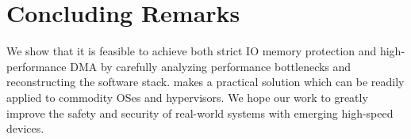 \section{Concluding Remarks}

We show that it is feasible to achieve both strict IO memory protection
    and high-performance DMA by 
    carefully analyzing performance bottlenecks
    and reconstructing the software stack.
{\name} makes a practical solution which can be readily applied to 
    commodity OSes and hypervisors.
We hope our work to greatly improve the safety 
    and security of real-world systems with emerging high-speed 
    devices.